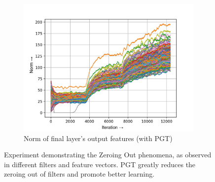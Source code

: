 \documentclass[times,sort&compress]{elsarticle}
\begin{document}
\begin{figure}[t]
\begin{subfigure}[t]{0.33\textwidth}
\includegraphics[width=\textwidth]{pgt-f-layer-22-1}
\caption{Norm of final layer's output features (with PGT)}
\end{subfigure}
\captionsetup{font=normalsize}
\caption{ Experiment demonstrating the Zeroing Out phenomena, as observed in different
filters and feature vectors. PGT greatly reduces the zeroing out of filters and promote
better learning. }
\label{fig:norm_plots}
\end{figure}
\end{document}

